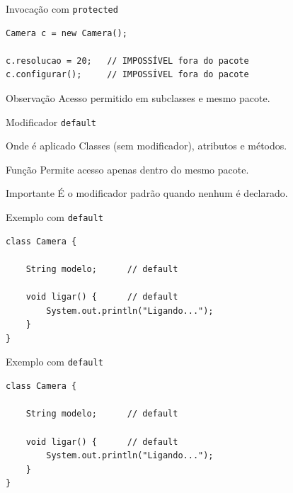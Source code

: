 \documentclass[9pt]{beamer}
\begin{document}
\begin{frame}[fragile]{Invocação com \texttt{protected}}

\begin{verbatim}
Camera c = new Camera();

c.resolucao = 20;   // IMPOSSÍVEL fora do pacote
c.configurar();     // IMPOSSÍVEL fora do pacote
\end{verbatim}

\begin{block}{Observação}
Acesso permitido em subclasses e mesmo pacote.
\end{block}

\end{frame}
\begin{frame}{Modificador \texttt{default}}

\begin{block}{Onde é aplicado}
Classes (sem modificador), atributos e métodos.
\end{block}

\begin{block}{Função}
Permite acesso apenas dentro do mesmo pacote.
\end{block}

\begin{block}{Importante}
É o modificador padrão quando nenhum é declarado.
\end{block}

\end{frame}
\begin{frame}[fragile]{Exemplo com \texttt{default}}

\begin{verbatim}
class Camera {

    String modelo;      // default

    void ligar() {      // default
        System.out.println("Ligando...");
    }
}
\end{verbatim}

\end{frame}
\begin{frame}[fragile]{Exemplo com \texttt{default}}

\begin{verbatim}
class Camera {

    String modelo;      // default

    void ligar() {      // default
        System.out.println("Ligando...");
    }
}
\end{verbatim}

\end{frame}
\end{document}
